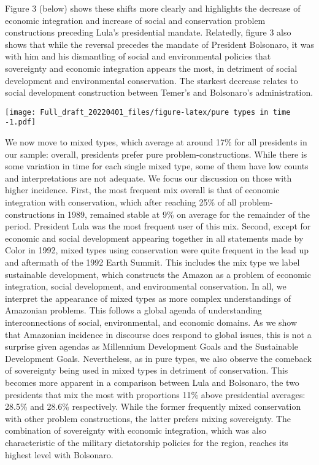 \documentclass[
]{article}
\begin{document}
Figure 3 (below) shows these shifts more clearly and highlights the
decrease of economic integration and increase of social and conservation
problem constructions preceding Lula's presidential mandate. Relatedly,
figure 3 also shows that while the reversal precedes the mandate of
President Bolsonaro, it was with him and his dismantling of social and
environmental policies that sovereignty and economic integration appears
the most, in detriment of social development and environmental
conservation. The starkest decrease relates to social development
construction between Temer's and Bolsonaro's administration.

\texttt{[image: Full\_draft\_20220401\_files/figure-latex/pure types in time -1.pdf]}

We now move to mixed types, which average at around 17\% for all
presidents in our sample: overall, presidents prefer pure
problem-constructions. While there is some variation in time for each
single mixed type, some of them have low counts and interpretations are
not adequate. We focus our discussion on those with higher incidence.
First, the most frequent mix overall is that of economic integration
with conservation, which after reaching 25\% of all
problem-constructions in 1989, remained stable at 9\% on average for the
remainder of the period. President Lula was the most frequent user of
this mix. Second, except for economic and social development appearing
together in all statements made by Color in 1992, mixed types using
conservation were quite frequent in the lead up and aftermath of the
1992 Earth Summit. This includes the mix type we label sustainable
development, which constructs the Amazon as a problem of economic
integration, social development, and environmental conservation. In all,
we interpret the appearance of mixed types as more complex
understandings of Amazonian problems. This follows a global agenda of
understanding interconnections of social, environmental, and economic
domains. As we show that Amazonian incidence in discourse does respond
to global issues, this is not a surprise given agendas as Millennium
Development Goals and the Sustainable Development Goals. Nevertheless,
as in pure types, we also observe the comeback of sovereignty being used
in mixed types in detriment of conservation. This becomes more apparent
in a comparison between Lula and Bolsonaro, the two presidents that mix
the most with proportions 11\% above presidential averages: 28.5\% and
28.6\% respectively. While the former frequently mixed conservation with
other problem constructions, the latter prefers mixing sovereignty. The
combination of sovereignty with economic integration, which was also
characteristic of the military dictatorship policies for the region,
reaches its highest level with Bolsonaro.
\end{document}
